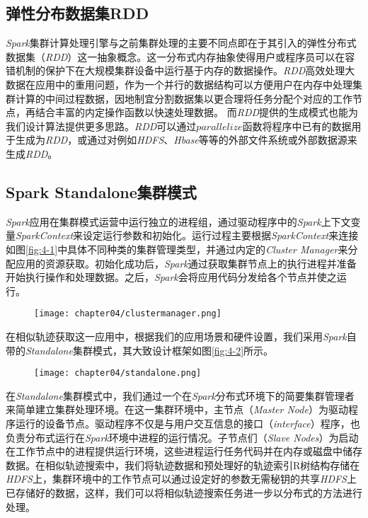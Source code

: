 \subsection{弹性分布数据集RDD}
\label{subsec:rdd}
\emph{Spark}集群计算处理引擎与之前集群处理的主要不同点即在于其引入的弹性分布式数据集（\emph{RDD}）这一抽象概念。这一分布式内存抽象使得用户或程序员可以在容错机制的保护下在大规模集群设备中运行基于内存的数据操作。\emph{RDD}高效处理大数据在应用中的重用问题，作为一个并行的数据结构可以方便用户在内存中处理集群计算的中间过程数据，因地制宜分割数据集以更合理将任务分配个对应的工作节点，再结合丰富的内定操作函数以快速处理数据。
而\emph{RDD}提供的生成模式也能为我们设计算法提供更多思路。\emph{RDD}可以通过$parallelize$函数将程序中已有的数据用于生成为\emph{RDD}，或通过对例如\emph{HDFS}、\emph{Hbase}等等的外部文件系统或外部数据源来生成\emph{RDD}。

\subsection{Spark Standalone集群模式}
\label{subsec:standalone}
\emph{Spark}应用在集群模式运营中运行独立的进程组，通过驱动程序中的\emph{Spark}上下文变量\emph{SparkContext}来设定运行参数和初始化。运行过程主要根据\emph{SparkContext}来连接如图\ref{fig:4-1}中具体不同种类的集群管理类型，并通过内定的\emph{Cluster Manager}来分配应用的资源获取。初始化成功后，\emph{Spark}通过获取集群节点上的执行进程并准备开始执行操作和处理数据。之后，\emph{Spark}会将应用代码分发给各个节点并使之运行。

\begin{figure}[!htp]
  \centering
  \texttt{[image: chapter04/clustermanager.png]}
\end{figure}

在相似轨迹获取这一应用中，根据我们的应用场景和硬件设置，我们采用\emph{Spark}自带的\emph{Standalone}集群模式，其大致设计框架如图\ref{fig:4-2}所示。

\begin{figure}[!htp]
  \centering
  \texttt{[image: chapter04/standalone.png]}
\end{figure}

在\emph{Standalone}集群模式中，我们通过一个在\emph{Spark}分布式环境下的简要集群管理者来简单建立集群处理环境。在这一集群环境中，主节点（\emph{Master Node}）为驱动程序运行的设备节点。驱动程序不仅是与用户交互信息的接口（\emph{interface}）程序，也负责分布式运行在\emph{Spark}环境中进程的运行情况。子节点们（\emph{Slave Nodes}）为启动在工作节点中的进程提供运行环境，这些进程运行任务代码并在内存或磁盘中储存数据。在相似轨迹搜索中，我们将轨迹数据和预处理好的轨迹索引R树结构存储在\emph{HDFS}上，集群环境中的工作节点可以通过设定好的参数无需秘钥的共享\emph{HDFS}上已存储好的数据，这样，我们可以将相似轨迹搜索任务进一步以分布式的方法进行处理。

